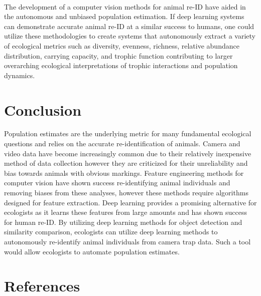 \documentclass[11pt]{article}
\begin{document}
\newline
\\
The development of a computer vision methods for animal re-ID have aided in the autonomous and unbiased population estimation. If deep learning systems can demonstrate accurate animal re-ID at a similar success to humans, one could utilize these methodologies to create systems that autonomously extract a variety of ecological metrics such as diversity, evenness, richness, relative abundance distribution, carrying capacity, and trophic function contributing to larger overarching ecological interpretations of trophic interactions and population dynamics.
\newline
\\
\section*{Conclusion}
Population estimates are the underlying metric for many fundamental ecological questions and relies on the accurate re-identification of animals. Camera and video data have become increasingly common due to their relatively inexpensive method of data collection however they are criticized for their unreliability and bias towards animals with obvious markings. Feature engineering methods for computer vision have shown success re-identifying animal individuals and removing biases from these analyses, however these methods require algorithms designed for feature extraction. Deep learning provides a promising alternative for ecologists as it learns these features from large amounts and has shown success for human re-ID. By utilizing deep learning methods for object detection and similarity comparison, ecologists can utilize deep learning methods to autonomously re-identify animal individuals from camera trap data. Such a tool would allow ecologists to automate population estimates.

\section*{References}
\end{document}
